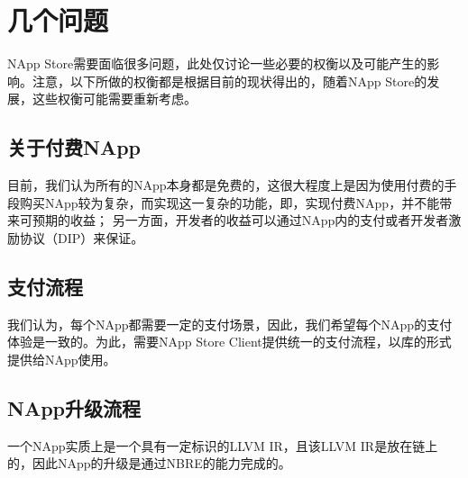 \section{几个问题}
NApp Store需要面临很多问题，此处仅讨论一些必要的权衡以及可能产生的影响。注意，以下所做的权衡都是根据目前的现状得出的，随着NApp Store的发展，这些权衡可能需要重新考虑。
\subsection{关于付费NApp}
目前，我们认为所有的NApp本身都是免费的，这很大程度上是因为使用付费的手段购买NApp较为复杂，而实现这一复杂的功能，即，实现付费NApp，并不能带来可预期的收益；
另一方面，开发者的收益可以通过NApp内的支付或者开发者激励协议（DIP）来保证。
\subsection{支付流程}
我们认为，每个NApp都需要一定的支付场景，因此，我们希望每个NApp的支付体验是一致的。为此，需要NApp Store Client提供统一的支付流程，以库的形式提供给NApp使用。

\subsection{NApp升级流程}
一个NApp实质上是一个具有一定标识的LLVM IR，且该LLVM IR是放在链上的，因此NApp的升级是通过NBRE的能力完成的。

